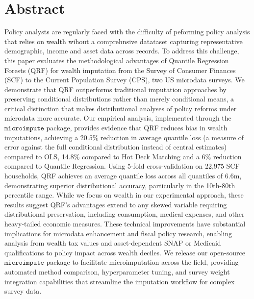 \section*{Abstract}

Policy analysts are regularly faced with the difficulty of peforming policy analysis that relies on wealth wihout a comprehnsive datataset capturing representative demographic, income and asset data across records. To address this challenge, this paper evaluates the methodological advantages of Quantile Regression Forests (QRF) for wealth imputation from the Survey of Consumer Finances (SCF) to the Current Population Survey (CPS), two US microdata surveys. We demonstrate that QRF outperforms traditional imputation approaches by preserving conditional distributions rather than merely conditional means, a critical distinction that makes distributional analyses of policy reforms under microdata more accurate. Our empirical analysis, implemented through the $\texttt{microimpute}$ package, provides evidence that QRF reduces bias in wealth imputations, achieving a 20.5\% reduction in average quantile loss (a measure of error against the full conditional distribution instead of central estimates) compared to OLS, 14.8\% compared to Hot Deck Matching and a 6\% reduction compared to Quantile Regression. Using 5-fold cross-validation on 22,975 SCF households, QRF achieves an average quantile loss across all quantiles of 6.6m, demonstrating superior distributional accuracy, particularly in the 10th-80th percentile range. While we focus on wealth in our experimental approach, these results suggest QRF's advantages extend to any skewed variable requiring distributional preservation, including consumption, medical expenses, and other heavy-tailed economic measures. These technical improvements have substantial implications for microdata enhancement and fiscal policy research, enabling analysis from wealth tax values and asset-dependent SNAP or Medicaid qualifications to policy impact across wealth deciles. We release our open-source $\texttt{microimpute}$ package to facilitate microimputation across the field, providing automated method comparison, hyperparameter tuning, and survey weight integration capabilities that streamline the imputation workflow for complex survey data.